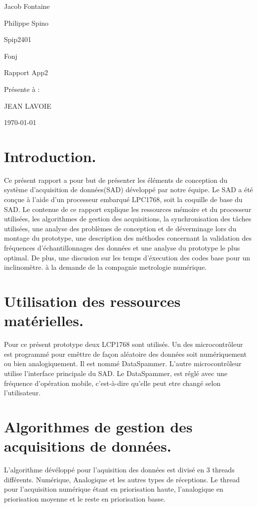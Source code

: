 \documentclass[12pt]{article}
\begin{document}
\begin{titlepage}
	\centering
	{\LARGE Jacob Fontaine \par
	 \LARGE Philippe Spino \par}
	\vspace{1cm}
	\small Spip2401\par
	\small Fonj\par 
	\vspace{3cm}
	{\Large Rapport App2\par}
	\vspace{5cm}
	{\Large Présente à :\par JEAN LAVOIE\par}
	\vspace{4cm}
	\vfill
	{\large \today\par}
\end{titlepage}

\newpage
\tableofcontents
\newpage
\section{Introduction.}
Ce présent rapport a pour but de présenter les éléments de conception du système d'acquisition de données(SAD) développé par notre équipe. Le SAD a été conçue à l'aide d'un processeur embarqué LPC1768, soit la coquille de base du SAD. Le contenue de ce rapport explique les ressources mémoire et du processeur utilisées, les algorithmes de gestion des acquisitions, la synchronisation des tâches utilisées, une analyse des problèmes de conception et de déverminage lors du montage du prototype, une description des méthodes concernant la validation des fréquences d'échantillonnages des données et une analyse du prototype le plus optimal. De plus, une discusion sur les temps d'éxecution des codes base pour un inclinomètre. à la demande de la compagnie metrologie numérique.
\section{Utilisation des ressources matérielles.}
\noindent
Pour ce présent prototype deux LCP1768 sont utilisés. Un des microcontrôleur est programmé pour emêttre de façon aléatoire des données soit numériquement ou bien analogiquement. Il est nommé DataSpammer. L'autre microcontrôleur utilise l'interface principale du SAD. Le DataSpammer, est réglé avec une fréquence d'opération mobile, c'est-à-dire qu'elle peut etre changé selon l'utilisateur.
\section{Algorithmes de gestion des acquisitions de données.}
L'algorithme dévéloppé pour l'aquisition des données est divisé en 3 threads différents. Numérique, Analogique et les autres types de réceptions. Le thread pour l'acquisition numérique étant en priorisation haute, l'analogique en priorisation moyenne et le reste en priorisation basse.
\end{document}
